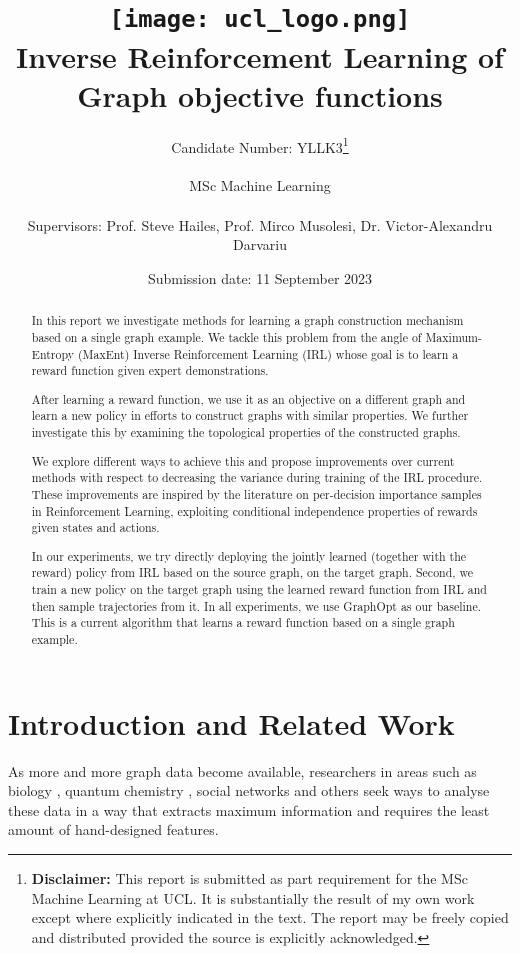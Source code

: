 \documentclass{report}
\title{
  { \texttt{[image: ucl\_logo.png]}}\\
  {{\Huge Inverse Reinforcement Learning of Graph objective functions}}\\
}
\date{Submission date: 11 September 2023}
\author{
  Candidate Number: YLLK3\thanks{
      {\bf Disclaimer:}
      This report is submitted as part requirement 
      for the MSc Machine Learning at UCL. It is
      substantially the result of my own work except 
      where explicitly indicated in the text.
      The report may be freely copied and 
      distributed provided the source is explicitly acknowledged.
    }
    \\ \\
  MSc Machine Learning\\ \\
  Supervisors: Prof. Steve Hailes, Prof. Mirco Musolesi, Dr. Victor-Alexandru Darvariu
}
\numberwithin{equation}{section}
\numberwithin{figure}{section}
\numberwithin{table}{section}
\numberwithin{algorithm}{section}
\begin{document}
\onehalfspacing
\maketitle

\begin{abstract}


  In this report we investigate methods for learning a graph 
  construction mechanism based on a single graph example. We 
  tackle this problem from the angle of Maximum-Entropy (MaxEnt) 
  Inverse Reinforcement Learning 
  (IRL) whose goal is to learn a reward function given 
  expert demonstrations. 
  
  After learning a reward function, we use it as an 
  objective on a different graph and learn a 
  new policy in efforts to construct graphs with similar properties.  
  We further investigate this by examining the topological 
  properties of the constructed graphs.
  
  We explore different ways to achieve this and 
  propose improvements over current methods with respect 
  to decreasing the variance during training of the IRL procedure. 
  These improvements are inspired by the 
  literature on per-decision importance samples 
  in Reinforcement Learning, exploiting conditional independence 
  properties of rewards given states and actions.
  
  In our experiments, we try  
  directly deploying the 
  jointly learned (together with the reward)  
  policy from IRL based on the source graph, 
  on the target graph. Second, 
  we train 
  a new policy on the target graph using the learned reward 
  function from IRL and then sample trajectories from it. 
  In all experiments, we use GraphOpt as our baseline. This 
  is a current algorithm that learns a reward function based 
  on a single graph example.
\end{abstract}
\tableofcontents
\setcounter{page}{1}

\chapter{Introduction and Related Work}\label{chap:intro}

As more and more graph data become available, researchers in 
areas such as biology \citep{VGAEDisease}, quantum chemistry 
\citep{MPNNs}, social networks \citep{SocialNets} and others 
seek ways to analyse these data in a way that extracts 
maximum information 
and requires the least amount of hand-designed features.
\end{document}
